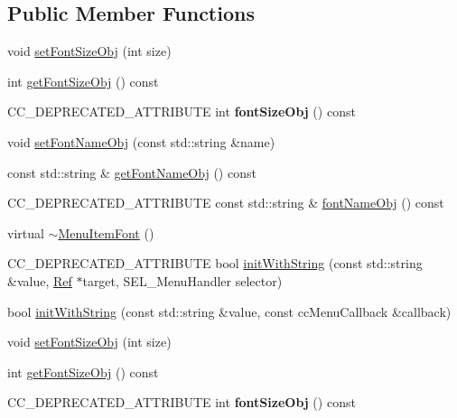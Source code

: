 \subsection*{Public Member Functions}
\begin{DoxyCompactItemize}
\item 
void \hyperlink{classMenuItemFont_aef699c4a066777868fa36c547cb4e62a}{set\+Font\+Size\+Obj} (int size)
\item 
int \hyperlink{classMenuItemFont_abbbd12f0961a32f185ba3613d3cf8d95}{get\+Font\+Size\+Obj} () const
\item 
\mbox{\label{classMenuItemFont_aca34530096396ff973714c7c39eed0c4}} 
C\+C\+\_\+\+D\+E\+P\+R\+E\+C\+A\+T\+E\+D\+\_\+\+A\+T\+T\+R\+I\+B\+U\+TE int {\bfseries font\+Size\+Obj} () const
\item 
void \hyperlink{classMenuItemFont_adc4776710917649f4dcb527d61ac49d7}{set\+Font\+Name\+Obj} (const std\+::string \&name)
\item 
const std\+::string \& \hyperlink{classMenuItemFont_a602990369beef06457153f39aefa42b9}{get\+Font\+Name\+Obj} () const
\item 
C\+C\+\_\+\+D\+E\+P\+R\+E\+C\+A\+T\+E\+D\+\_\+\+A\+T\+T\+R\+I\+B\+U\+TE const std\+::string \& \hyperlink{classMenuItemFont_a839ea5b34276117ca79a1f920ceb4c81}{font\+Name\+Obj} () const
\item 
virtual \hyperlink{classMenuItemFont_a2247b475527e0b457c3f01700abcf275}{$\sim$\+Menu\+Item\+Font} ()
\item 
C\+C\+\_\+\+D\+E\+P\+R\+E\+C\+A\+T\+E\+D\+\_\+\+A\+T\+T\+R\+I\+B\+U\+TE bool \hyperlink{classMenuItemFont_abb6d2b844564ef2f1f234771332600a4}{init\+With\+String} (const std\+::string \&value, \hyperlink{classRef}{Ref} $\ast$target, S\+E\+L\+\_\+\+Menu\+Handler selector)
\item 
bool \hyperlink{classMenuItemFont_adcc053518d3c01691ed13798055188e8}{init\+With\+String} (const std\+::string \&value, const cc\+Menu\+Callback \&callback)
\item 
void \hyperlink{classMenuItemFont_aef699c4a066777868fa36c547cb4e62a}{set\+Font\+Size\+Obj} (int size)
\item 
int \hyperlink{classMenuItemFont_abbbd12f0961a32f185ba3613d3cf8d95}{get\+Font\+Size\+Obj} () const
\item 
\mbox{\label{classMenuItemFont_aca34530096396ff973714c7c39eed0c4}} 
C\+C\+\_\+\+D\+E\+P\+R\+E\+C\+A\+T\+E\+D\+\_\+\+A\+T\+T\+R\+I\+B\+U\+TE int {\bfseries font\+Size\+Obj} () const

\end{DoxyCompactItemize}
